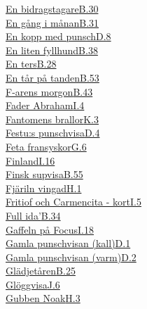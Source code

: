   \hyperref[bidragstagare]{En bidragstagare}\dotfill\hyperref[bidragstagare]{B.30}\\
  \hyperref[engangimanan]{En gång i månan}\dotfill\hyperref[engangimanan]{B.31}\\
  \hyperref[enkoppmedpunsch]{En kopp med punsch}\dotfill\hyperref[enkoppmedpunsch]{D.8}\\
  \hyperref[fyllhund]{En liten fyllhund}\dotfill\hyperref[fyllhund]{B.38}\\
  \hyperref[enters]{En ters}\dotfill\hyperref[enters]{B.28}\\
  \hyperref[entarpatanden]{En tår på tanden}\dotfill\hyperref[entarpatanden]{B.53}\\
  \hyperref[farensmorgon]{F-arens morgon}\dotfill\hyperref[farensmorgon]{B.43}\\
  \hyperref[faderabraham]{Fader Abraham}\dotfill\hyperref[faderabraham]{I.4}\\
  \hyperref[fantomensbrallor]{Fantomens brallor}\dotfill\hyperref[fantomensbrallor]{K.3}\\
  \hyperref[festu]{Festu:s punschvisa}\dotfill\hyperref[festu]{D.4}\\
  \hyperref[fetafransyskor]{Feta fransyskor}\dotfill\hyperref[fetafransyskor]{G.6}\\
  \hyperref[finland]{Finland}\dotfill\hyperref[finland]{I.16}\\
  \hyperref[finsksup]{Finsk supvisa}\dotfill\hyperref[finsksup]{B.55}\\
  \hyperref[fjarilnvingad]{Fjäriln vingad}\dotfill\hyperref[fjarilnvingad]{H.1}\\
  \hyperref[fritiof]{Fritiof och Carmencita - kort}\dotfill\hyperref[fritiof]{I.5}\\
  \hyperref[fullida]{Full ida'}\dotfill\hyperref[fullida]{B.34}\\
  \hyperref[gaffelnpafocus]{Gaffeln på Focus}\dotfill\hyperref[gaffelnpafocus]{I.18}\\
  \hyperref[gamlakall]{Gamla punschvisan (kall)}\dotfill\hyperref[gamlakall]{D.1}\\
  \hyperref[gamlavarm]{Gamla punschvisan (varm)}\dotfill\hyperref[gamlavarm]{D.2}\\
  \hyperref[gladjetaren]{Glädjetåren}\dotfill\hyperref[gladjetaren]{B.25}\\
  \hyperref[gloggvisa]{Glöggvisa}\dotfill\hyperref[gloggvisa]{J.6}\\
  \hyperref[fredmanssangno35]{Gubben Noak}\dotfill\hyperref[fredmanssangno35]{H.3}\\
